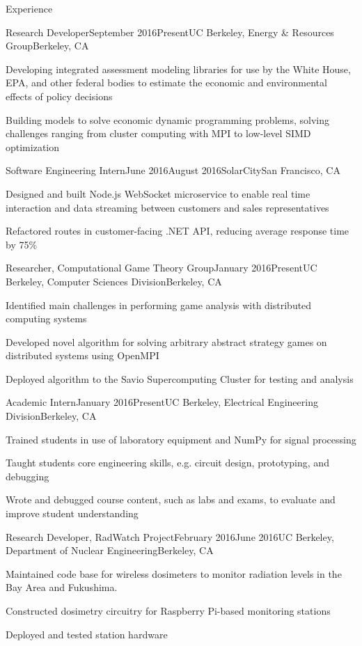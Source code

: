 \documentclass{resume} %
\begin{document}
\begin{rSection}{Experience}
\begin{rSubsection}{Research Developer}{September 2016\textminus Present}{UC Berkeley, Energy \& Resources Group}{Berkeley, CA}
\item[] Developing integrated assessment modeling libraries for use by the White House, EPA, and other federal bodies to estimate the economic and environmental effects of policy decisions 
\item[] Building models to solve economic dynamic programming problems, solving challenges ranging from cluster computing with MPI to low-level SIMD optimization
\end{rSubsection}
\begin{rSubsection}{Software Engineering Intern}{June 2016\textminus August 2016}{SolarCity}{San Francisco, CA}
\item[] Designed and built Node.js WebSocket microservice to enable real time interaction and data streaming between customers and sales representatives
\item[] Refactored routes in customer-facing .NET API, reducing average response time by 75\%
\end{rSubsection}
\begin{rSubsection}{Researcher, Computational Game Theory Group}{January 2016\textminus Present}{UC Berkeley, Computer Sciences Division}{Berkeley, CA}
\item[] Identified main challenges in performing game analysis with distributed computing systems
\item[] Developed novel algorithm for solving arbitrary abstract strategy games on distributed systems using OpenMPI
\item[] Deployed algorithm to the Savio Supercomputing Cluster for testing and analysis
\end{rSubsection}
\begin{rSubsection}{Academic Intern}{January 2016\textminus Present}{UC Berkeley, Electrical Engineering Division}{Berkeley, CA}
\item[] Trained students in use of laboratory equipment and NumPy for signal processing
\item[] Taught students core engineering skills, e.g. circuit design, prototyping, and debugging
\item[] Wrote and debugged course content, such as labs and exams, to evaluate and improve student understanding
\end{rSubsection}
\begin{rSubsection}{Research Developer, RadWatch Project}{February 2016\textminus June 2016}{UC Berkeley, Department of Nuclear Engineering}{Berkeley, CA}
\item[] Maintained code base for wireless dosimeters to monitor radiation levels in the Bay Area and Fukushima.
\item[] Constructed dosimetry circuitry for Raspberry Pi-based monitoring stations
\item[] Deployed and tested station hardware
\end{rSubsection}
\end{rSection}
\end{document}
